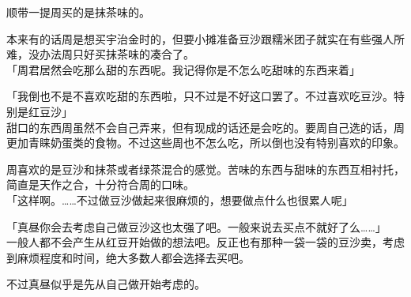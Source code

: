 顺带一提周买的是抹茶味的。

本来有的话周是想买宇治金时的，但要小摊准备豆沙跟糯米团子就实在有些强人所难，没办法周只好买抹茶味的凑合了。\\

「周君居然会吃那么甜的东西呢。我记得你是不怎么吃甜味的东西来着」

「我倒也不是不喜欢吃甜的东西啦，只不过是不好这口罢了。不过喜欢吃豆沙。特别是红豆沙」\\

甜口的东西周虽然不会自己弄来，但有现成的话还是会吃的。要周自己选的话，周更加青睐奶蛋类的食物。不过这些周也不怎么吃，所以倒也没有特别喜欢的印象。

周喜欢的是豆沙和抹茶或者绿茶混合的感觉。苦味的东西与甜味的东西互相衬托，简直是天作之合，十分符合周的口味。\\

「这样啊。……不过做豆沙做起来很麻烦的，想要做点什么也很累人呢」

「真昼你会去考虑自己做豆沙这也太强了吧。一般来说去买点不就好了么……」\\

一般人都不会产生从红豆开始做的想法吧。反正也有那种一袋一袋的豆沙卖，考虑到麻烦程度和时间，绝大多数人都会选择去买吧。

不过真昼似乎是先从自己做开始考虑的。\\

